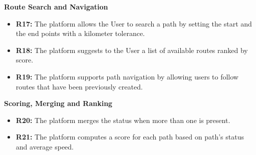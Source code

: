 \textbf{Route Search and Navigation}
\begin{itemize}
    \item \textbf{R17:} The platform allows the User to search a path by setting the start and the end points with a kilometer tolerance.
    \item \textbf{R18:} The platform suggests to the User a list of available routes ranked by score.
    \item \textbf{R19:} The platform supports path navigation by allowing users to follow routes that have been previously created.
\end{itemize}
\textbf{Scoring, Merging and Ranking}
\begin{itemize}
    \item \textbf{R20:} The platform merges the status when more than one is present.
    \item \textbf{R21:} The platform computes a score for each path based on path's status and average speed.
\end{itemize}
\newpage
